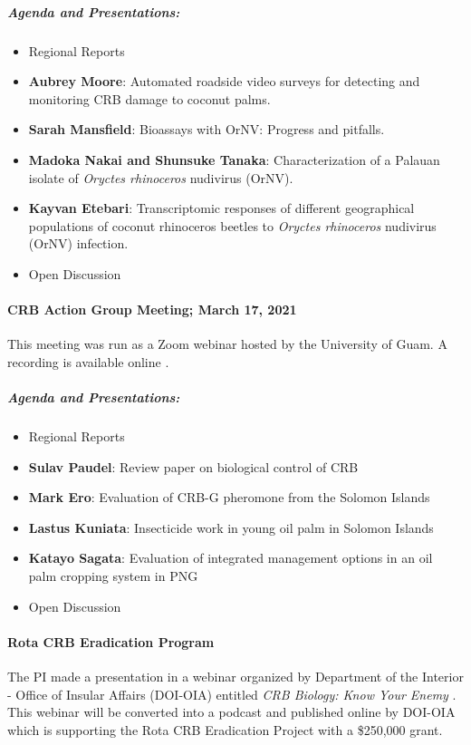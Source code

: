 \documentclass[12pt,letterpaper,english,bibliography=totocnumbered,abstract=on]{scrartcl}
\begin{document}
\subparagraph{Agenda and Presentations:}

\begin{itemize}
	\item Regional Reports
	\item \textbf{Aubrey Moore}: Automated roadside video surveys for detecting and monitoring CRB damage to coconut palms. \cite{mooreAutomatedRoadsideVideo2020}
	\item \textbf{Sarah Mansfield}: Bioassays with OrNV: Progress and pitfalls.
	\item \textbf{Madoka Nakai and Shunsuke Tanaka}: Characterization of a Palauan isolate of \textit{Oryctes rhinoceros} nudivirus (OrNV).
	\item \textbf{Kayvan Etebari}: Transcriptomic responses of different geographical populations of coconut rhinoceros beetles to \textit{Oryctes rhinoceros} nudivirus (OrNV) infection.
	\item Open Discussion	
\end{itemize}


\paragraph{CRB Action Group Meeting; March 17, 2021}
This meeting was run as a Zoom webinar hosted by the University of Guam. A recording is available online \cite{mooreVideoRecordingCRBG2020}.

\subparagraph{Agenda and Presentations:}
\begin{itemize}
	\item Regional Reports
	\item \textbf{Sulav Paudel}: Review paper on biological control of CRB
	\item \textbf{Mark Ero}: Evaluation of CRB-G pheromone from the Solomon Islands
	\item \textbf{Lastus Kuniata}: Insecticide work in young oil palm in Solomon Islands
	\item \textbf{Katayo Sagata}: Evaluation of integrated management options in an oil palm cropping system in PNG
	\item Open Discussion	
\end{itemize}


\paragraph{Rota CRB Eradication Program}
The PI made a presentation in a webinar organized by Department of the Interior - Office of Insular Affairs (DOI-OIA) entitled \textit{CRB Biology: Know Your Enemy} \cite{mooreCRBBiologyKnow2021}. This webinar will be converted into a podcast and published online by DOI-OIA which is supporting the Rota CRB Eradication Project with a \$250,000 grant.
\end{document}
